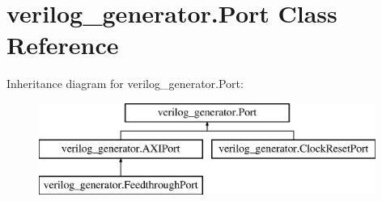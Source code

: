 \hypertarget{classverilog__generator_1_1Port}{\section{verilog\-\_\-generator.\-Port Class Reference}
\label{classverilog__generator_1_1Port}
}
Inheritance diagram for verilog\-\_\-generator.\-Port\-:\begin{figure}[H]
\begin{center}
\leavevmode
\includegraphics[height=3.000000cm]{classverilog__generator_1_1Port}
\end{center}
\end{figure}
